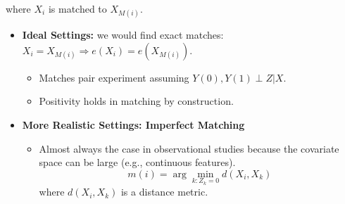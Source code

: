 \begin{center}
\end{center}

where $X_i$ is matched to $X_{M(i)}$.

\begin{itemize}
\item \textbf{Ideal Settings:} we would find exact matches: $X_i = X_{M(i)} \Rightarrow e(X_i) = e(X_{M(i)})$.
    \begin{itemize}
        \item Matches pair experiment assuming $Y(0), Y(1) \perp Z | X$.
        \item Positivity holds in matching by construction.
    \end{itemize}
\item \textbf{More Realistic Settings: Imperfect Matching }
    \begin{itemize}
    \item Almost always the case in observational studies because the covariate space can be large (e.g., continuous features).
    \[
    m(i) = \arg \min_{k: Z_k = 0} d(X_i, X_k)
\]
where $d(X_i, X_k)$ is a distance metric.
    \end{itemize}
\end{itemize}


